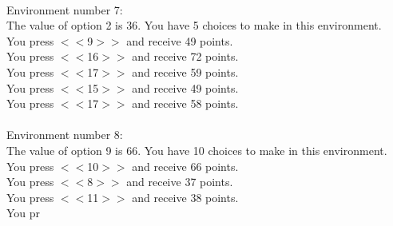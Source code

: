 \documentclass[pdflatex,sn-nature]{sn-jnl}%
\theoremstyle{thmstyleone}%
\theoremstyle{thmstyletwo}%
\theoremstyle{thmstylethree}%
\begin{document}
 $~$\\ 
Environment number 7: $~$\\ 
The value of option 2 is 36. You have 5 choices to make in this environment. $~$\\ 
You press $<<$9$>>$ and receive 49 points. $~$\\ 
You press $<<$16$>>$ and receive 72 points. $~$\\ 
You press $<<$17$>>$ and receive 59 points. $~$\\ 
You press $<<$15$>>$ and receive 49 points. $~$\\ 
You press $<<$17$>>$ and receive 58 points. $~$\\ 
 $~$\\ 
Environment number 8: $~$\\ 
The value of option 9 is 66. You have 10 choices to make in this environment. $~$\\ 
You press $<<$10$>>$ and receive 66 points. $~$\\ 
You press $<<$8$>>$ and receive 37 points. $~$\\ 
You press $<<$11$>>$ and receive 38 points. $~$\\ 
You pr
\end{document}
